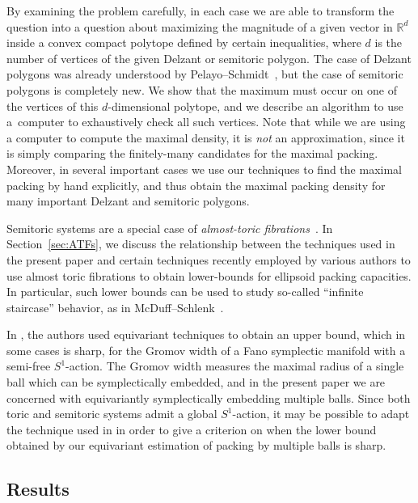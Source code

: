 \documentclass[pdftex]{sigma}
\numberwithin{equation}{section}
\begin{document}
By examining the problem carefully, in each case we are able to transform the question into a question about maximizing the magnitude of a given vector in $\mathbb{R}^d$ inside a convex compact polytope defined by certain inequalities, where $d$ is the number of vertices of the given Delzant or semitoric polygon.
The case of Delzant polygons was already understood by Pelayo--Schmidt~\cite{PeSc2008}, but the case of semitoric polygons is completely new.
We show that the maximum must occur on one of the vertices of this $d$-dimensional polytope, and we describe an algorithm to use a~computer to exhaustively check all such vertices.
Note that while we are using a computer to compute the maximal density, it is \emph{not} an approximation, since it is simply comparing the finitely-many candidates for the maximal packing.
Moreover, in several important cases we use our techniques to find the maximal packing by hand explicitly, and thus obtain the
maximal packing density for many important Delzant and semitoric polygons.

\begin{Remark}\label{rmk:ATF}
Semitoric systems are a special case of \emph{almost-toric fibrations}~\cite{Sy2003}.
In Section~\ref{sec:ATFs}, we discuss the relationship between the techniques used in the present paper and certain techniques recently employed by various authors to use almost toric fibrations to obtain lower-bounds for ellipsoid packing capacities. In particular, such lower bounds can be used to study so-called ``infinite staircase'' behavior, as in McDuff--Schlenk~\cite{MS12}.
\end{Remark}

\begin{Remark}\label{rmk:S1-actions-sharp}
In \cite{HS17}, the authors used equivariant techniques to obtain an upper bound, which in some cases is sharp, for the Gromov width of a Fano symplectic manifold with a semi-free $S^1$-action.
The Gromov width measures the maximal radius of a single ball which can be symplectically embedded, and in the present paper we are concerned with equivariantly symplectically embedding multiple balls.
Since both toric and semitoric systems admit a global $S^1$-action, it may be possible to adapt the technique used in \cite{HS17} in order to give a criterion on when the lower bound obtained by our equivariant estimation of packing by multiple balls is sharp.
\end{Remark}

\subsection{Results}
\end{document}
